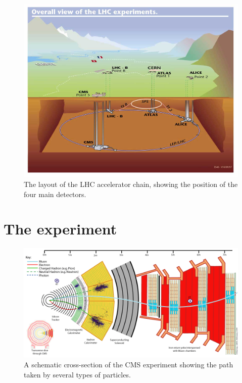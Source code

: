 \begin{figure}
  \includegraphics[width=\largefigwidth]{plots/detector/lhc_layout_sch.jpg}
  \caption{The layout of the LHC accelerator chain, showing the position of the four main detectors.}%
  \label{fig:lhclayout}
\end{figure}


\section{The \CMS experiment}
\label{sec:CMSInDetail}

\begin{figure}
  \includegraphics[width=1.2\largefigwidth]{plots/detector/CMS_Slice.png}
  \caption{A schematic cross-section of the CMS experiment showing the path taken by several types of particles.}%
  \label{fig:cmsschematic}
\end{figure}


